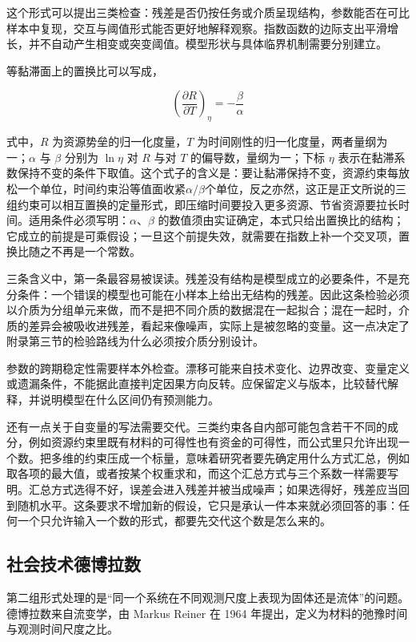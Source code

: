 这个形式可以提出三类检查：残差是否仍按任务或介质呈现结构，参数能否在可比样本中复现，交互与阈值形式能否更好地解释观察。指数函数的边际支出平滑增长，并不自动产生相变或突变阈值。模型形状与具体临界机制需要分别建立。

等黏滞面上的置换比可以写成，

\begin{equation}
\left(\frac{\partial R}{\partial T}\right)_{\eta}=-\frac{\beta}{\alpha}
\end{equation}

式中，$R$ 为资源势垒的归一化度量，$T$ 为时间刚性的归一化度量，两者量纲为一；$\alpha$ 与 $\beta$ 分别为 $\ln\eta$ 对 $R$ 与对 $T$ 的偏导数，量纲为一；下标 $\eta$ 表示在黏滞系数保持不变的条件下取值。这个式子的含义是：要让黏滞保持不变，资源约束每放松一个单位，时间约束沿等值面收紧$\alpha/\beta$个单位，反之亦然，这正是正文所说的三组约束可以相互置换的定量形式，即压缩时间要投入更多资源、节省资源要拉长时间。适用条件必须写明：$\alpha$、$\beta$ 的数值须由实证确定，本式只给出置换比的结构；它成立的前提是可乘假设；一旦这个前提失效，就需要在指数上补一个交叉项，置换比随之不再是一个常数。

三条含义中，第一条最容易被误读。残差没有结构是模型成立的必要条件，不是充分条件：一个错误的模型也可能在小样本上给出无结构的残差。因此这条检验必须以介质为分组单元来做，而不是把不同介质的数据混在一起拟合；混在一起时，介质的差异会被吸收进残差，看起来像噪声，实际上是被忽略的变量。这一点决定了附录第三节的检验路线为什么必须按介质分别设计。

参数的跨期稳定性需要样本外检查。漂移可能来自技术变化、边界改变、变量定义或遗漏条件，不能据此直接判定因果方向反转。应保留定义与版本，比较替代解释，并说明模型在什么区间仍有预测能力。

还有一点关于自变量的写法需要交代。三类约束各自内部可能包含若干不同的成分，例如资源约束里既有材料的可得性也有资金的可得性，而公式里只允许出现一个数。把多维的约束压成一个标量，意味着研究者要先确定用什么方式汇总，例如取各项的最大值，或者按某个权重求和，而这个汇总方式与三个系数一样需要写明。汇总方式选得不好，误差会进入残差并被当成噪声；如果选得好，残差应当回到随机水平。这条要求不增加新的假设，它只是承认一件本来就必须回答的事：任何一个只允许输入一个数的形式，都要先交代这个数是怎么来的。

\subsection{社会技术德博拉数}

第二组形式处理的是“同一个系统在不同观测尺度上表现为固体还是流体”的问题。德博拉数来自流变学，由 Markus Reiner 在 1964 年提出，定义为材料的弛豫时间与观测时间尺度之比。\cite{reiner1964deborah}

